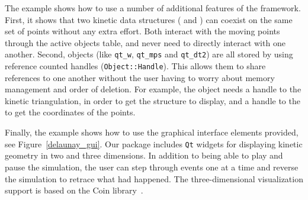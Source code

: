 The example shows how to use a number of additional features of the
framework. First, it shows that two kinetic data structures
( and
) can coexist on the same set of
points without any extra effort. Both interact with the moving points
through the active objects table, and never need to directly interact
with one another. Second, objects (like
\texttt{qt\_w}, \texttt{qt\_mps} and \texttt{qt\_dt2}) are all stored
by using reference counted handles (\texttt{Object::Handle}). This
allows them to share references to one another without the user having
to worry about memory management and order of deletion.  For example,
the  object needs a handle to the kinetic
triangulation, in order to get the structure to display, and a handle
to the  to get the coordinates of the
points.


Finally, the example shows how to use the graphical interface elements
provided, see Figure~\ref{delaunay_gui}. Our package includes
\texttt{Qt} widgets for displaying kinetic geometry in two and three
dimensions. In addition to being able to play and pause the
simulation, the user can step through events one at a time and reverse
the simulation to retrace what had happened. The three-dimensional
visualization support is based on the Coin library~\cite{Coin}.

